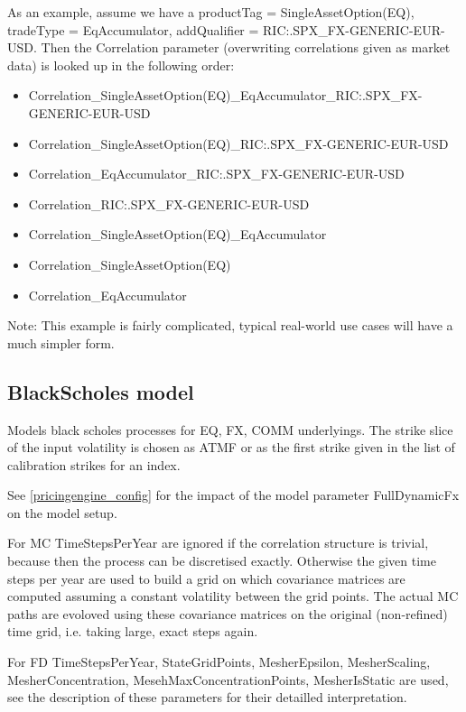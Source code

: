 As an example, assume we have a productTag = SingleAssetOption(EQ), tradeType = EqAccumulator, addQualifier =
RIC:.SPX\_FX-GENERIC-EUR-USD. Then the Correlation parameter (overwriting correlations given as market data) is looked
up in the following order:

\begin{itemize}
\item Correlation\_SingleAssetOption(EQ)\_EqAccumulator\_RIC:.SPX\_FX-GENERIC-EUR-USD
\item Correlation\_SingleAssetOption(EQ)\_RIC:.SPX\_FX-GENERIC-EUR-USD
\item Correlation\_EqAccumulator\_RIC:.SPX\_FX-GENERIC-EUR-USD
\item Correlation\_RIC:.SPX\_FX-GENERIC-EUR-USD
\item Correlation\_SingleAssetOption(EQ)\_EqAccumulator
\item Correlation\_SingleAssetOption(EQ)
\item Correlation\_EqAccumulator
\end{itemize}

Note: This example is fairly complicated, typical real-world use cases will have a much simpler form.

\subsection{BlackScholes model}\label{blackscholes}

Models black scholes processes for EQ, FX, COMM underlyings. The strike slice of the input volatility is chosen as ATMF
or as the first strike given in the list of calibration strikes for an index.

See \ref{pricingengine_config} for the impact of the model parameter FullDynamicFx on the model setup.

For MC TimeStepsPerYear are ignored if the correlation structure is trivial, because then the process can be discretised
exactly. Otherwise the given time steps per year are used to build a grid on which covariance matrices are computed
assuming a constant volatility between the grid points. The actual MC paths are evoloved using these covariance matrices
on the original (non-refined) time grid, i.e. taking large, exact steps again.

For FD TimeStepsPerYear, StateGridPoints, MesherEpsilon, MesherScaling, MesherConcentration,
MesehMaxConcentrationPoints, MesherIsStatic are used, see the description of these parameters for their detailled
interpretation.

